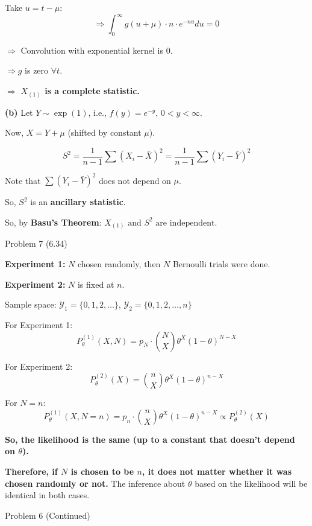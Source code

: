 \documentclass[12pt,a4paper,onecolumn]{exam}
\newcommand{\questionheader}[1]{%
  \begin{tcolorbox}[
    enhanced,
    colback=black,
    coltext=white,
    boxrule=0pt,
    fontupper=\Large\bfseries,
    arc=4mm
  ]
  #1
  \end{tcolorbox}%
}
\begin{document}
\begin{solution}
Take $u = t - \mu$:
\[
\Rightarrow \int_{0}^{\infty} g(u + \mu) \cdot n \cdot e^{-nu} du = 0
\]

$\Rightarrow$ Convolution with exponential kernel is 0.

$\Rightarrow g$ is zero $\forall t$.

$\Rightarrow$ \textbf{$X_{(1)}$ is a complete statistic.}

\vspace{1em}
\textbf{(b)} Let $Y \sim \exp(1)$, i.e., $f(y) = e^{-y}$, $0 < y < \infty$.

Now, $X = Y + \mu$ (shifted by constant $\mu$).

\[
S^2 = \frac{1}{n-1} \sum (X_i - \bar{X})^2 = \frac{1}{n-1} \sum (Y_i - \bar{Y})^2
\]

Note that $\sum (Y_i - \bar{Y})^2$ does not depend on $\mu$.

So, $S^2$ is an \textbf{ancillary statistic}.

So, by \textbf{Basu's Theorem}: $\boxed{X_{(1)} \text{ and } S^2 \text{ are independent}}$.
\end{solution}

\questionheader{Problem 7 (6.34)}

\begin{solution}
\textbf{Experiment 1:} $N$ chosen randomly, then $N$ Bernoulli trials were done.

\textbf{Experiment 2:} $N$ is fixed at $n$.

Sample space: $\mathcal{Y}_1 = \{0, 1, 2, \ldots\}$, $\mathcal{Y}_2 = \{0, 1, 2, \ldots, n\}$

\vspace{0.5em}
For Experiment 1:
\[
P_{\theta}^{(1)}(X, N) = p_N \cdot \binom{N}{X} \theta^X (1-\theta)^{N-X}
\]

For Experiment 2:
\[
P_{\theta}^{(2)}(X) = \binom{n}{X} \theta^X (1-\theta)^{n-X}
\]

For $N = n$:
\[
P_{\theta}^{(1)}(X, N = n) = p_n \cdot \binom{n}{X} \theta^X (1-\theta)^{n-X} \propto P_{\theta}^{(2)}(X)
\]

\textbf{So, the likelihood is the same (up to a constant that doesn't depend on $\theta$).}

\textbf{Therefore, if $N$ is chosen to be $n$, it does not matter whether it was chosen randomly or not.} The inference about $\theta$ based on the likelihood will be identical in both cases.
\end{solution}

\questionheader{Problem 6 (Continued)}
\end{document}
